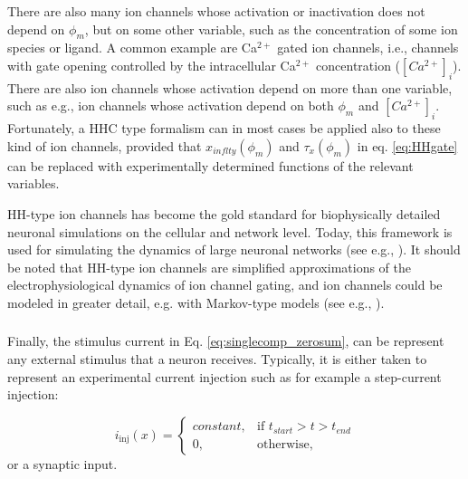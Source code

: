 There are also many ion channels whose activation or inactivation does not depend on $\phi_m$, but on some other variable, such as the concentration of some ion species or ligand. A common example are Ca$^{2+}$ gated ion channels, i.e., channels with gate opening controlled by the intracellular Ca$^{2+}$ concentration ($[Ca^{2+}]_i$). There are also ion channels whose activation depend on more than one variable, such as e.g., ion channels whose activation depend on both $\phi_m$ and $[Ca^{2+}]_i$. Fortunately, a HHC type formalism can in most cases be applied also to these kind of ion channels, provided that $x_{inflty}(\phi_m)$ and $\tau_x(\phi_m)$ in eq. \ref{eq:HHgate} can be replaced with experimentally determined functions of the relevant variables. 

HH-type ion channels has become the gold standard for biophysically detailed neuronal simulations on the cellular and network level. Today, this framework is used for simulating the dynamics of large neuronal networks (see e.g., \cite{traub2005, markram2015, arkhipov2018}). It should be noted that HH-type ion channels are simplified approximations of the electrophysiological dynamics of ion channel gating, and ion channels could be modeled in greater detail, e.g. with Markov-type models (see e.g., \cite{Destexhe1994, balbi2017}). 


\subsubsection{}
Finally, the stimulus current in Eq. \ref{eq:singlecomp_zerosum}, can be represent any external stimulus that a neuron receives. Typically, it is either taken to represent an experimental current injection such as for example a step-current injection:

\begin{equation}
i_\text{inj}(x)= 
\begin{cases}
    constant, & \text{if } t_{start} > t > t_{end} \\
    0,              & \text{otherwise},
\end{cases}
\label{eq:injected}
\end{equation}
or a synaptic input. 


